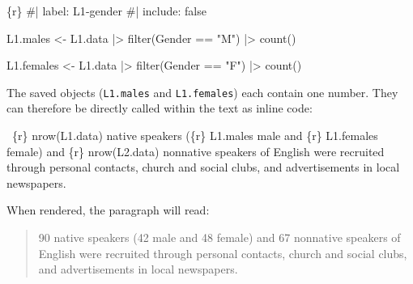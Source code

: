 \documentclass[
  letterpaper,
  DIV=11,
  numbers=noendperiod]{scrreprt}
\newenvironment{Shaded}{\begin{snugshade}}{\end{snugshade}}
\newcommand{\CommentTok}[1]{\textcolor[rgb]{0.37,0.37,0.37}{#1}}
\newcommand{\FunctionTok}[1]{\textcolor[rgb]{0.28,0.35,0.67}{#1}}
\newcommand{\InformationTok}[1]{\textcolor[rgb]{0.37,0.37,0.37}{#1}}
\newcommand{\NormalTok}[1]{\textcolor[rgb]{0.00,0.23,0.31}{#1}}
\newcommand{\OtherTok}[1]{\textcolor[rgb]{0.00,0.23,0.31}{#1}}
\newcommand{\SpecialCharTok}[1]{\textcolor[rgb]{0.37,0.37,0.37}{#1}}
\newcommand{\StringTok}[1]{\textcolor[rgb]{0.13,0.47,0.30}{#1}}
\begin{document}
\begin{Shaded}
\begin{Highlighting}[]
\InformationTok{\textasciigrave{}\textasciigrave{}\textasciigrave{}\{r\}}
\CommentTok{\#| label: L1{-}gender}
\CommentTok{\#| include: false}

\NormalTok{L1.males }\OtherTok{\textless{}{-}}\NormalTok{ L1.data }\SpecialCharTok{|\textgreater{}}
  \FunctionTok{filter}\NormalTok{(Gender }\SpecialCharTok{==} \StringTok{"M"}\NormalTok{) }\SpecialCharTok{|\textgreater{}}
  \FunctionTok{count}\NormalTok{()}

\NormalTok{L1.females }\OtherTok{\textless{}{-}}\NormalTok{ L1.data }\SpecialCharTok{|\textgreater{}}
  \FunctionTok{filter}\NormalTok{(Gender }\SpecialCharTok{==} \StringTok{"F"}\NormalTok{) }\SpecialCharTok{|\textgreater{}}
  \FunctionTok{count}\NormalTok{()}
\InformationTok{\textasciigrave{}\textasciigrave{}\textasciigrave{}}
\end{Highlighting}
\end{Shaded}

The saved objects (\texttt{L1.males} and \texttt{L1.females}) each
contain one number. They can therefore be directly called within the
text as inline code:

\begin{Shaded}
\begin{Highlighting}[]
 \InformationTok{\textasciigrave{}\{r\} nrow(L1.data)\textasciigrave{}}\NormalTok{ native speakers (}\InformationTok{\textasciigrave{}\{r\} L1.males\textasciigrave{}}\NormalTok{ male and }\InformationTok{\textasciigrave{}\{r\} L1.females\textasciigrave{}}\NormalTok{ female) and }\InformationTok{\textasciigrave{}\{r\} nrow(L2.data)\textasciigrave{}}\NormalTok{ nonnative speakers of English were recruited through personal contacts, church and social clubs, and advertisements in local newspapers.}
\end{Highlighting}
\end{Shaded}

When rendered, the paragraph will read:

\begin{quote}
90 native speakers (42 male and 48 female) and 67 nonnative speakers of
English were recruited through personal contacts, church and social
clubs, and advertisements in local newspapers.
\end{quote}
\end{document}
